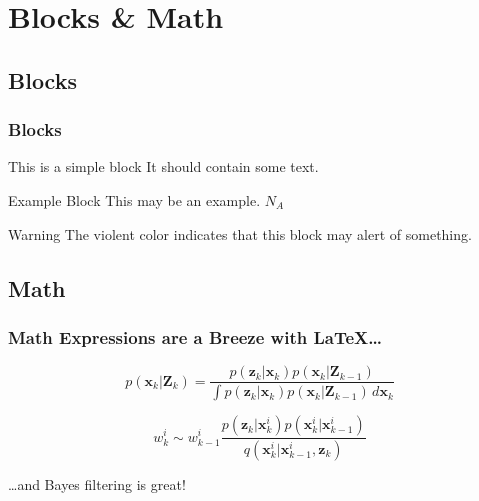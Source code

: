 \documentclass{beamer}
\begin{document}
\section{Blocks \& Math}
\subsection{Blocks}
\begin{frame}
   \frametitle{Blocks}

   \begin{block}{This is a simple block}
      It should contain some text.
   \end{block}

   \begin{exampleblock}{Example Block}
      This may be an example.
      $N_A$
   \end{exampleblock}


   \begin{alertblock}{Warning}
      The violent color indicates that this block may alert of something.
   \end{alertblock}
\end{frame}



\subsection{Math} 
\begin{frame}
   \frametitle{Math Expressions are a Breeze with \LaTeX \ldots}

   \begin{equation}
      p(\mathbf{x}_{k}|\mathbf{Z}_{k}) = \frac{p(\mathbf{z}_{k}|\mathbf{x     }_{k})p(\mathbf{x}_{k}|\mathbf{Z}_{k-1})}{\int \! p(\mathbf{z}_{k}|\mathbf{     x}_{k})p(\mathbf{x}_{k}|\mathbf{Z}_{k-1})\,d\mathbf{x}_{k}}
   \end{equation}

   \begin{equation}
      w_{k}^{i} \sim w_{k-1}^{i}\frac{p(\mathbf{z}_{k}|\mathbf{x}_{k}^{i})p(\mathbf{x}_{k}^{i}|\mathbf{x}_{k-1}^{i})}{q(\mathbf{x}_{k}^{i}|\mathbf{x}_{k-1}^{i},\mathbf{z}_{k})}
   \end{equation}

   \ldots and Bayes filtering is great!

\end{frame}
\end{document}
